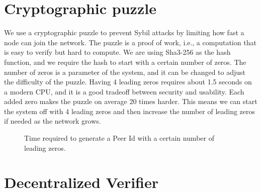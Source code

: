 \section{Cryptographic puzzle}

We use a cryptographic puzzle to prevent Sybil attacks by limiting how fast a node can join the network.
The puzzle is a proof of work, i.e., a computation that is easy to verify but hard to compute.
We are using Sha3-256 \cite{sha3} as the hash function, and we require the hash to start with a certain number of zeros.
The number of zeros is a parameter of the system, and it can be changed to adjust the difficulty of the puzzle.
Having 4 leading zeros requires about 1.5 seconds on a modern CPU, and it is a good tradeoff between security and usability.
Each added zero makes the puzzle on average 20 times harder.
This means we can start the system off with 4 leading zeros and then increase the number of leading zeros if needed as the network grows.

\begin{figure}
  \myfloatalign
  \caption[]{Time required to generate a Peer Id with a certain number of leading zeros.}
  \label{fig:pretty-graph}
\end{figure}

\section{Decentralized Verifier}
